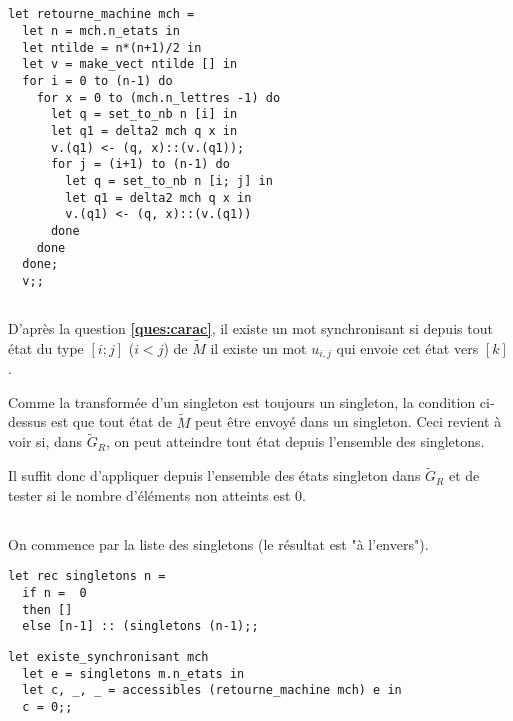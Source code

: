 \subsection{}
\begin{lstlisting}
let retourne_machine mch =
  let n = mch.n_etats in
  let ntilde = n*(n+1)/2 in
  let v = make_vect ntilde [] in
  for i = 0 to (n-1) do
    for x = 0 to (mch.n_lettres -1) do
      let q = set_to_nb n [i] in
      let q1 = delta2 mch q x in
      v.(q1) <- (q, x)::(v.(q1));
      for j = (i+1) to (n-1) do
        let q = set_to_nb n [i; j] in
        let q1 = delta2 mch q x in
        v.(q1) <- (q, x)::(v.(q1))
      done
    done
  done;
  v;;
\end{lstlisting}
\subsection{}
D'après la question {\bf \ref{ques:carac}}, il existe un mot synchronisant si depuis tout état du type $[i;j]$ ($i<j$) de $\widetilde{M}$ il existe un mot $u_{i,j}$ qui envoie cet état vers $[k]$. 

Comme la transformée d'un singleton est toujours un singleton, la condition ci-dessus est que tout état de $\widetilde{M}$ peut être envoyé dans un singleton. Ceci revient à voir si, dans $\widetilde{G}_R$, on peut atteindre tout état depuis l'ensemble des singletons.

Il suffit donc d'appliquer  depuis l'ensemble des états singleton dans $\widetilde{G}_R$ et de tester si le nombre d'éléments non atteints est 0.

\newpage
\subsection{}
On commence par la liste des singletons (le résultat est "à l'envers").
\begin{lstlisting}
let rec singletons n =
  if n =  0 
  then []
  else [n-1] :: (singletons (n-1);;
\end{lstlisting}

\begin{lstlisting}
let existe_synchronisant mch
  let e = singletons m.n_etats in
  let c, _, _ = accessibles (retourne_machine mch) e in
  c = 0;;
\end{lstlisting}





